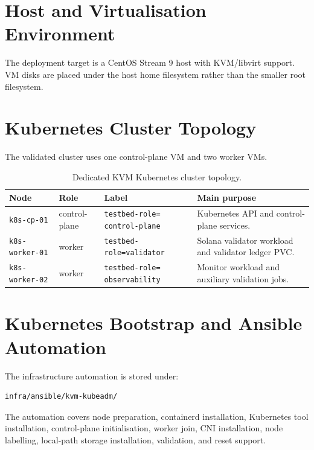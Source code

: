 \documentclass[11pt,a4paper]{article}
\begin{document}
\section{Host and Virtualisation Environment}

The deployment target is a CentOS Stream 9 host with KVM/libvirt support. VM disks are placed under the host home filesystem rather than the smaller root filesystem.

\section{Kubernetes Cluster Topology}

The validated cluster uses one control-plane VM and two worker VMs.

\begin{table}[htbp]
\centering
\small
\caption{Dedicated KVM Kubernetes cluster topology.}
\label{tab:kvm-cluster-topology}
\begin{tabularx}{\textwidth}{@{}p{}p{}p{}X@{}}
\toprule
Node & Role & Label & Main purpose \\
\midrule
\texttt{k8s-cp-01} &
control-plane &
\texttt{testbed-role= control-plane} &
Kubernetes API and control-plane services. \\

\texttt{k8s-worker-01} &
worker &
\texttt{testbed-role=validator} &
Solana validator workload and validator ledger PVC. \\

\texttt{k8s-worker-02} &
worker &
\texttt{testbed-role= observability} &
Monitor workload and auxiliary validation jobs. \\
\bottomrule
\end{tabularx}
\end{table}

\section{Kubernetes Bootstrap and Ansible Automation}

The infrastructure automation is stored under:

\begin{lstlisting}
infra/ansible/kvm-kubeadm/
\end{lstlisting}

The automation covers node preparation, containerd installation, Kubernetes tool installation, control-plane initialisation, worker join, CNI installation, node labelling, local-path storage installation, validation, and reset support.
\end{document}
